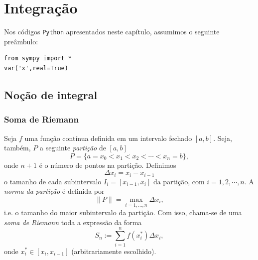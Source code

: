 
\chapter{Integração}\label{cap_int}
\thispagestyle{fancy}

\ifispython
\begin{obs}\label{obs:cap_int_python}
  Nos códigos \verb+Python+ apresentados neste capítulo, assumimos o seguinte preâmbulo:
\begin{verbatim}
from sympy import *
var('x',real=True)
\end{verbatim}
\end{obs}
\fi

\section{Noção de integral}\label{cap_int_sec_nocaoint}

\subsection{Soma de Riemann}

Seja $f$ uma função contínua definida em um intervalo fechado $[a, b]$. Seja, também, $P$ a seguinte \emph{partição} de $[a, b]$
\begin{equation}
  P = \{a=x_0<x_1<x_2<\cdots<x_n=b\},
\end{equation}
onde $n+1$ é o número de pontos na partição. Definimos
\begin{equation}
  \Delta x_i = x_{i} - x_{i-1}
\end{equation}
o tamanho de cada subintervalo $I_{i} = [x_{i-1}, x_{i}]$ da partição, com $i = 1, 2, \cdots, n$. A \emph{norma da partição} é definida por
\begin{equation}
  \|P\| = \max_{i=1, \dotsc, n} \Delta x_i,
\end{equation}
i.e. o tamanho do maior subintervalo da partição. Com isso, chama-se de uma \emph{soma de Riemann} toda a expressão da forma
\begin{equation}
  S_n := \sum_{i=1}^n f(x_i^*)\Delta x_i,
\end{equation}
onde $x_i^*\in [x_i, x_{i-1}]$ (arbitrariamente escolhido).

